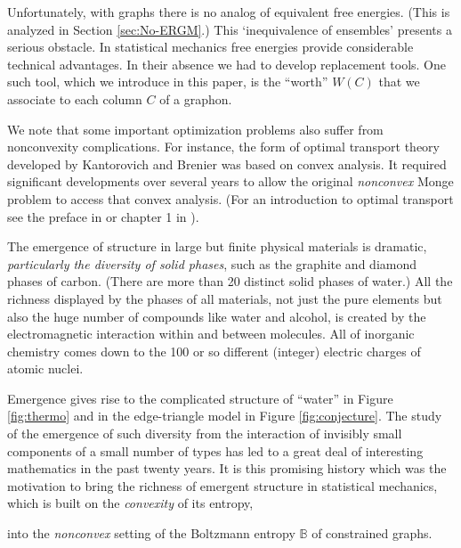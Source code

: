 \documentclass[12pt]{amsart}
\newcommand{\B}{\mathbb{B}}
\newcommand{\tet}{\textit}
\newcommand{\Value}{worth}
\begin{document}
{Unfortunately, with graphs there is no analog of equivalent free energies. (This is analyzed in Section \ref{sec:No-ERGM}.)
This `inequivalence of ensembles' presents a serious obstacle. In statistical mechanics free energies provide considerable technical advantages. In their absence we had to develop replacement tools.
One such tool, which we introduce in this paper, is the
``\Value'' $W(C)$ that we associate to each column $C$
of a graphon. 

We note that some important optimization problems also suffer from 
nonconvexity complications. For instance, the form of optimal transport 
theory developed by Kantorovich and Brenier was based on convex analysis.
It required significant developments over several years to allow the original {\em nonconvex} Monge 
problem to access that convex analysis. (For an introduction to optimal transport see the preface in 
\cite{San} or chapter 1 in \cite{Mag}).


The emergence of structure in large but finite physical materials is
dramatic, {\em particularly the diversity of solid phases}, such as the graphite and diamond phases of carbon. (There are more than 20 distinct solid phases of water.) All the richness displayed by the phases of all materials, not 
just the pure elements but also the huge number of compounds 
like water and alcohol, is created by the electromagnetic interaction within 
and between molecules. All of inorganic 
chemistry comes down to the 100 or so different (integer) electric 
charges of atomic nuclei. 

Emergence gives rise to the complicated 
structure of ``water'' in Figure \ref{fig:thermo} and in the edge-triangle model 
in Figure \ref{fig:conjecture}. The study of the emergence of such diversity from the interaction of 
invisibly small components of a small number of types has led to a great 
deal of interesting mathematics in the past twenty years.
It is this promising history which was the motivation to bring the richness of emergent structure in
statistical mechanics, which is built on the {\em convexity} of its 
entropy,

into the \tet{nonconvex} setting of the Boltzmann entropy $\B$ of constrained graphs. 

}
\end{document}
